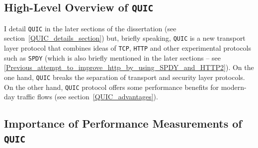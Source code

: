 \documentclass[12pt,a4paper,twoside,openright]{report}
\begin{document}
 
 
 

\subsection{High-Level Overview of \texttt{QUIC}}
I detail \texttt{QUIC} in the later sections of the dissertation (see section~\ref{QUIC_details_section}) but, briefly speaking, \texttt{QUIC} is a new transport layer protocol that combines ideas of \texttt{TCP}, \texttt{HTTP} and other experimental protocols such as \texttt{SPDY} (which is also briefly mentioned in the later sections -- see \ref{Previous_attempt_to_improve_http_by_using_SPDY_and_HTTP2}).
On the one hand, \texttt{QUIC} breaks the separation of transport and security layer protocols. 
On the other hand, \texttt{QUIC} protocol offers some performance benefits for modern-day traffic flows (see section~\ref{QUIC_advantages}).


\subsection{Importance of Performance Measurements of \texttt{QUIC}}
\end{document}
